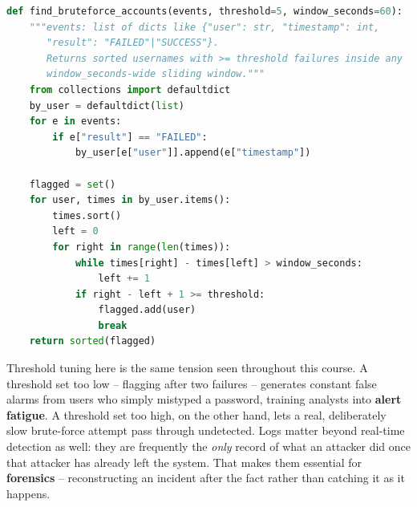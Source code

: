\begin{lstlisting}[language=Python, caption={Detecting a brute-force login pattern via log correlation}]
def find_bruteforce_accounts(events, threshold=5, window_seconds=60):
    """events: list of dicts like {"user": str, "timestamp": int,
       "result": "FAILED"|"SUCCESS"}.
       Returns sorted usernames with >= threshold failures inside any
       window_seconds-wide sliding window."""
    from collections import defaultdict
    by_user = defaultdict(list)
    for e in events:
        if e["result"] == "FAILED":
            by_user[e["user"]].append(e["timestamp"])

    flagged = set()
    for user, times in by_user.items():
        times.sort()
        left = 0
        for right in range(len(times)):
            while times[right] - times[left] > window_seconds:
                left += 1
            if right - left + 1 >= threshold:
                flagged.add(user)
                break
    return sorted(flagged)
\end{lstlisting}

Threshold tuning here is the same tension seen throughout this course. A threshold set too low --
flagging after two failures -- generates constant false alarms from users who simply mistyped a
password, training analysts into \textbf{alert fatigue}. A threshold set too high, on the other hand,
lets a real, deliberately slow brute-force attempt pass through undetected. Logs matter beyond
real-time detection as well: they are frequently the \emph{only} record of what an attacker did once
that attacker has already left the system. That makes them essential for \textbf{forensics} --
reconstructing an incident after the fact rather than catching it as it happens.

